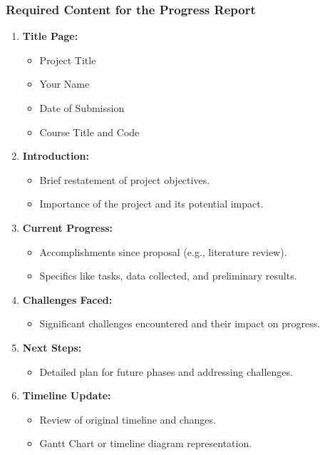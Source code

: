 \documentclass{beamer}
\begin{document}
\begin{frame}[fragile]
    \frametitle{Required Content for the Progress Report}
    \begin{enumerate}
        \item \textbf{Title Page:}
        \begin{itemize}
            \item Project Title
            \item Your Name
            \item Date of Submission
            \item Course Title and Code
        \end{itemize}
        
        \item \textbf{Introduction:}
        \begin{itemize}
            \item Brief restatement of project objectives.
            \item Importance of the project and its potential impact.
        \end{itemize}
        
        \item \textbf{Current Progress:}
        \begin{itemize}
            \item Accomplishments since proposal (e.g., literature review).
            \item Specifics like tasks, data collected, and preliminary results.
        \end{itemize}
        
        \item \textbf{Challenges Faced:}
        \begin{itemize}
            \item Significant challenges encountered and their impact on progress.
        \end{itemize}
        
        \item \textbf{Next Steps:}
        \begin{itemize}
            \item Detailed plan for future phases and addressing challenges.
        \end{itemize}
        
        \item \textbf{Timeline Update:}
        \begin{itemize}
            \item Review of original timeline and changes.
            \item Gantt Chart or timeline diagram representation.
        \end{itemize}
    \end{enumerate}
\end{frame}
\end{document}
